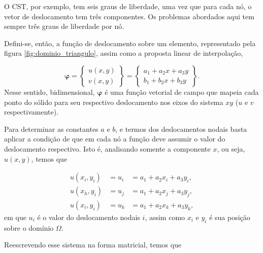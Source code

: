 O CST, por exemplo, tem seis graus de liberdade, uma vez que para cada nó, o vetor de deslocamento tem três componentes. Os problemas abordados aqui tem sempre três graus de liberdade por nó.

Defini-se, então, a função de deslocamento sobre um elemento, representado pela figura \ref{fig:dominio_triangulo}, assim como a proposta linear de interpolação,

\begin{equation}
    \bm{\varphi} = \begin{Bmatrix}
        u(x,y) \\ v(x,y) 
    \end{Bmatrix} = \begin{Bmatrix}
        a_1 + a_2 x + a_3 y \\ b_1 + b_2 x + b_3 y 
    \end{Bmatrix}.
\end{equation}
Nesse sentido, bidimensional, $\bm{\varphi}$ é uma função vetorial de campo que mapeia cada ponto do sólido para seu respectivo deslocamento nos eixos do sistema $xy$ ($u$ e $v$ respectivamente).

Para determinar as constantes $a$ e $b$, e termos dos deslocamentos nodais basta aplicar a condição de que em cada nó a função deve assumir o valor do deslocamento respectivo. Isto é, analisando somente a componente $x$, ou seja, $u(x,y)$, temos que

\begin{align}
    u(x_i, y_i) &= u_i &= a_1 + a_2 x_i + a_3 y_i, \\
    u(x_h, y_i) &= u_j &= a_1 + a_2 x_j + a_3 y_j, \\
    u(x_i, y_i) &= u_k &= a_1 + a_2 x_k + a_3 y_k,
\end{align}
em que $u_i$ é o valor do deslocamento nodais $i$, assim como $x_i$ e $y_i$ é sua posição sobre o domínio $\Omega$.
 
Reescrevendo esse sistema na forma matricial, temos que

